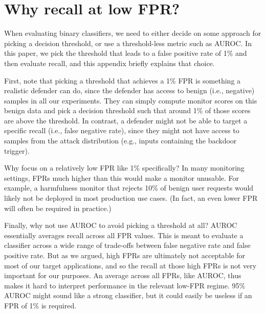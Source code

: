 \documentclass{article}
\begin{document}
\section{Why recall at low FPR?}\label{sec:metrics}
When evaluating binary classifiers, we need to either decide on some approach for picking a decision threshold, or use a threshold-less metric such as AUROC. In this paper, we pick the threshold that leads to a false positive rate of 1\% and then evaluate recall, and this appendix briefly explains that choice.

First, note that picking a threshold that achieves a 1\% FPR is something a realistic defender can do, since the defender has access to benign (i.e., negative) samples in all our experiments. They can simply compute monitor scores on this benign data and pick a decision threshold such that around 1\% of those scores are above the threshold. In contrast, a defender might not be able to target a specific recall (i.e., false negative rate), since they might not have access to samples from the attack distribution (e.g., inputs containing the backdoor trigger).

Why focus on a relatively low FPR like 1\% specifically? In many monitoring settings, FPRs much higher than this would make a monitor unusable. For example, a harmfulness monitor that rejects 10\% of benign user requests would likely not be deployed in most production use cases. (In fact, an even lower FPR will often be required in practice.)

Finally, why not use AUROC to avoid picking a threshold at all? AUROC essentially averages recall across all FPR values. This is meant to evaluate a classifier across a wide range of trade-offs between false negative rate and false positive rate. But as we argued, high FPRs are ultimately not acceptable for most of our target applications, and so the recall at those high FPRs is not very important for our purposes. An average across all FPRs, like AUROC, thus makes it hard to interpret performance in the relevant low-FPR regime. 95\% AUROC might sound like a strong classifier, but it could easily be useless if an FPR of 1\% is required.
\end{document}
